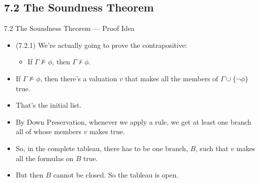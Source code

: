 \subsection{7.2 The Soundness Theorem}

\begin{frame}{7.2 The Soundness Theorem --- Proof Idea}

	\begin{itemize}

		\item (7.2.1) We're actually going to prove the contrapositive:
		
			\begin{itemize}
			
				\item If $\Gamma\nvDash\phi$, then $\Gamma\nvdash\phi$.
			
			\end{itemize}
			
		\item If $\Gamma\nvDash\phi$, then there's a valuation $v$ that makes all the members of $\Gamma\cup\{\neg\phi\}$ true.
		
		\item That's the initial list. 
		
		
		\item By Down Preservation, whenever we apply a rule, we get at least one branch all of whose members $v$ makes true.
		
		\item So, in the complete tableau, there has to be one branch, $B$, such that $v$ makes all the formulas on $B$ true.

		\item But then $B$ cannot be closed. So the tableau is open.

	\end{itemize}

\end{frame}

